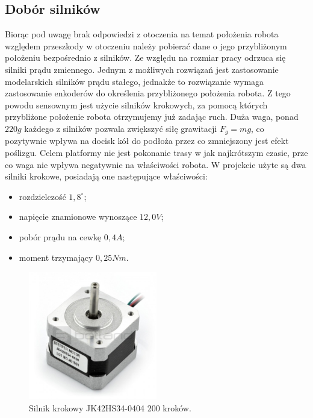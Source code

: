 \subsection{Dobór silników}
Biorąc pod uwagę brak odpowiedzi z otoczenia na temat położenia robota względem przeszkody w otoczeniu należy pobierać dane o jego przybliżonym położeniu bezpośrednio z silników. Ze względu na rozmiar pracy odrzuca się silniki prądu zmiennego. Jednym z możliwych rozwiązań jest zastosowanie modelarskich silników prądu stałego, jednakże to rozwiązanie wymaga zastosowanie enkoderów do określenia przybliżonego położenia robota. Z tego powodu sensownym jest użycie silników krokowych, za pomocą których przybliżone położenie robota otrzymujemy już zadając ruch. Duża waga, ponad $220g$ każdego z silników pozwala zwiększyć siłę grawitacji $F_g=mg$, co pozytywnie wpływa na docisk kół do podłoża przez co zmniejszony jest efekt poślizgu. Celem platformy nie jest pokonanie trasy w jak najkrótszym czasie, prze co waga nie wpływa negatywnie na właściwości robota. W projekcie użyte są dwa silniki krokowe, posiadają one następujące właściwości:
\begin{itemize}
    \item rozdzielczość $1,8^\circ$;
    \item napięcie znamionowe wynoszące $12,0 V$;
    \item pobór prądu na cewkę $0,4 A$;
    \item moment trzymający $0,25 Nm$.
\end{itemize}
\begin{figure}[H]
\centering
\includegraphics[width=0.5\textwidth]{inzynierku/img/silnik.jpg}
\caption{\label{fig:silnik_krokowy}Silnik krokowy JK42HS34-0404 200 kroków.}
\end{figure}

